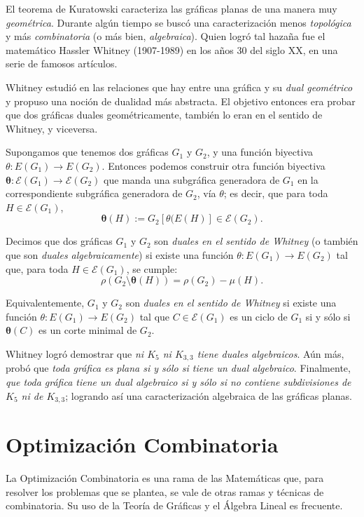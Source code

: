 El teorema de Kuratowski caracteriza las gráficas planas de una manera muy \textit{geométrica}. Durante algún tiempo se buscó una caracterización menos \textit{topológica} y más \textit{combinatoria} (o más bien, \textit{algebraica}). Quien logró tal hazaña fue el matemático Hassler Whitney (1907-1989) en los años $30$ del siglo XX, en una serie de famosos artículos.

Whitney estudió en \cite{Whitney1935} las relaciones que hay entre una gráfica y su \textit{dual geométrico} y propuso una noción de dualidad más abstracta. El objetivo entonces era probar que dos gráficas duales geométricamente, también lo eran en el sentido de Whitney, y viceversa.

Supongamos que tenemos dos gráficas $G_{1}$ y $G_{2}$, y una función biyectiva $\theta \colon E(G_{1}) \rightarrow E(G_{2})$. Entonces podemos construir otra función biyectiva $\boldsymbol{\theta} \colon \mathcal{E}(G_{1}) \rightarrow \mathcal{E}(G_{2})$ que manda una subgráfica generadora de $G_{1}$ en la correspondiente subgráfica generadora de $G_{2}$, vía $\theta$; es decir, que para toda $H \in \mathcal{E}(G_{1})$, $$\boldsymbol{\theta}(H):= G_{2}[\theta(E(H)] \in \mathcal{E}(G_{2}).$$

Decimos que dos gráficas $G_{1}$ y $G_{2}$ son \textit{duales en el sentido de Whitney} (o también que son \textit{duales algebraicamente}) si existe una función $\theta \colon E(G_{1}) \rightarrow E(G_{2})$ tal que, para toda $H\in \mathcal{E}(G_{1})$, se cumple:
$$\rho(G_{2} \setminus \boldsymbol{\theta}(H)) = \rho(G_{2}) - \mu(H).$$

Equivalentemente, $G_{1}$ y $G_{2}$ son \textit{duales en el sentido de Whitney} si existe una función $\theta \colon E(G_{1}) \rightarrow E(G_{2})$ tal que $C \in \mathcal{E}(G_{1})$ es un ciclo de $G_{1}$ si y sólo si $\boldsymbol{\theta}(C)$ es un corte minimal de $G_{2}$.

Whitney logró demostrar que \textit{ni $K_{5}$ ni  $K_{3,3}$ tiene duales algebraicos}. Aún más, probó que \textit{toda gráfica es plana si y sólo si tiene un dual algebraico}. Finalmente, \textit{que toda gráfica tiene un dual algebraico si y sólo si no contiene subdivisiones de $K_{5}$ ni de $K_{3,3}$}; logrando así una caracterización algebraica de las gráficas planas.

\section{Optimización Combinatoria}
La Optimización Combinatoria es una rama de las Matemáticas que, para resolver los problemas que se plantea, se vale de otras ramas y técnicas de combinatoria. Su uso de la Teoría de Gráficas y el Álgebra Lineal es frecuente.

